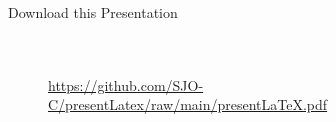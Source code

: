 \documentclass{beamer}
\begin{document}
\begin{frame}{Download this Presentation}
\begin{centering}
\begin{figure}[h]
\\~\\
\url{https://github.com/SJO-C/presentLatex/raw/main/presentLaTeX.pdf}
\label{qrandLinkforPresent}
\end{figure}
\end{centering}
\end{frame}
\end{document}

